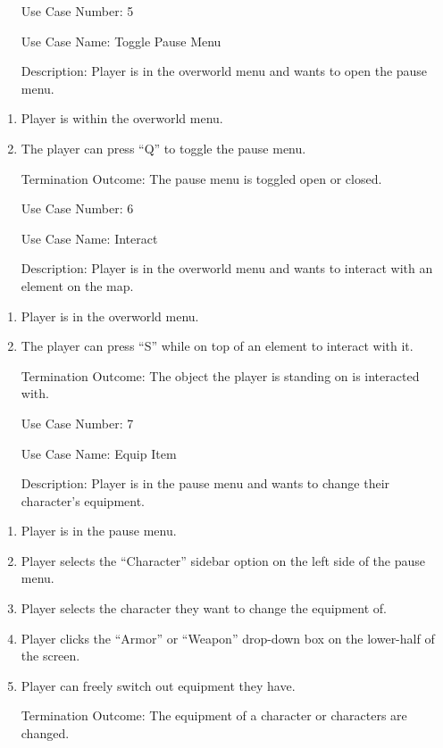 \documentclass[10pt,conference,onecolumn,compsoc]{IEEEtran}
\begin{document}
\begin{itemize}
\item[Use Case Number:] 5
\item[Use Case Name:] Toggle Pause Menu
\item[Description:] Player is in the overworld menu and wants to open the pause menu.
\end{itemize}
\begin{enumerate}
\item Player is within the overworld menu.
\item The player can press “Q” to toggle the pause menu.
\item [Termination Outcome:] The pause menu is toggled open or closed.
\end{enumerate}

\begin{itemize}
\item[Use Case Number:] 6
\item[Use Case Name:] Interact
\item[Description:] Player is in the overworld menu and wants to interact with an element on the map.
\end{itemize}
\begin{enumerate}
\item Player is in the overworld menu.
\item The player can press “S” while on top of an element to interact with it.
\item [Termination Outcome:] The object the player is standing on is interacted with.
\end{enumerate}

\begin{itemize}
\item[Use Case Number:] 7
\item[Use Case Name:] Equip Item
\item[Description:] Player is in the pause menu and wants to change their character's equipment.
\end{itemize}
\begin{enumerate}
\item Player is in the pause menu.
\item Player selects the “Character” sidebar option on the left side of the pause menu.
\item Player selects the character they want to change the equipment of.
\item Player clicks the “Armor” or “Weapon” drop-down box on the lower-half of the screen.
\item Player can freely switch out equipment they have.
\item [Termination Outcome:] The equipment of a character or characters are changed.
\end{enumerate}
\end{document}
